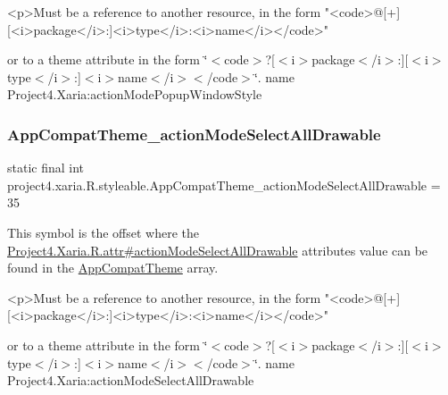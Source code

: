 \begin{DoxyVerb}      <p>Must be a reference to another resource, in the form "<code>@[+][<i>package</i>:]<i>type</i>:<i>name</i></code>"
\end{DoxyVerb}
 or to a theme attribute in the form \char`\"{}$<$code$>$?\mbox{[}$<$i$>$package$<$/i$>$\+:\mbox{]}\mbox{[}$<$i$>$type$<$/i$>$\+:\mbox{]}$<$i$>$name$<$/i$>$$<$/code$>$\char`\"{}.  name Project4.\+Xaria\+:action\+Mode\+Popup\+Window\+Style \mbox{\label{classproject4_1_1xaria_1_1R_1_1styleable_aff61e2a5924190bb7479ef2b13c8c7c0}} 
\subsubsection{\texorpdfstring{App\+Compat\+Theme\+\_\+action\+Mode\+Select\+All\+Drawable}{AppCompatTheme\_actionModeSelectAllDrawable}}
{\footnotesize\ttfamily static final int project4.\+xaria.\+R.\+styleable.\+App\+Compat\+Theme\+\_\+action\+Mode\+Select\+All\+Drawable = 35\hspace{0.3cm}{\ttfamily [static]}}

This symbol is the offset where the \hyperlink{}{Project4.\+Xaria.\+R.\+attr\#action\+Mode\+Select\+All\+Drawable} attribute\textquotesingle{}s value can be found in the \hyperlink{classproject4_1_1xaria_1_1R_1_1styleable_aad8bec413e2350f9404e6ff0e831a85d}{App\+Compat\+Theme} array.

\begin{DoxyVerb}      <p>Must be a reference to another resource, in the form "<code>@[+][<i>package</i>:]<i>type</i>:<i>name</i></code>"
\end{DoxyVerb}
 or to a theme attribute in the form \char`\"{}$<$code$>$?\mbox{[}$<$i$>$package$<$/i$>$\+:\mbox{]}\mbox{[}$<$i$>$type$<$/i$>$\+:\mbox{]}$<$i$>$name$<$/i$>$$<$/code$>$\char`\"{}.  name Project4.\+Xaria\+:action\+Mode\+Select\+All\+Drawable \mbox{\label{classproject4_1_1xaria_1_1R_1_1styleable_ac049b8452b5594eff2fe1f6122e11e61}} 
